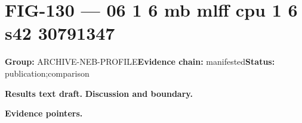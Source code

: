 \clearpage
\section{FIG-130 --- 06 1 6 mb mlff cpu 1 6 s42 30791347}
\label{figpage:fig-130}
\textbf{Group:} ARCHIVE-NEB-PROFILE\quad \textbf{Evidence chain:} manifested\quad \textbf{Status:} publication;comparison

\textbf{Results text draft.} 
\textbf{Discussion and boundary.} 


\textbf{Evidence pointers.}



\vfill
